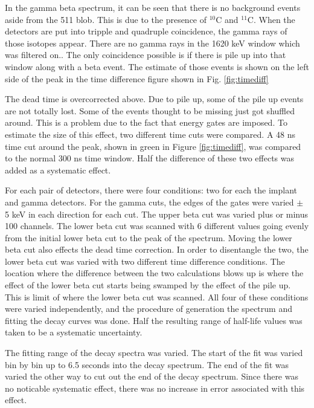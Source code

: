 In the gamma beta spectrum, it can be seen that there is no background events aside from the 511 blob.
This is due to the presence of $^{10}$C and $^{11}$C.
When the detectors are put into tripple and quadruple coincidence, the gamma rays of those isotopes appear.
There are no gamma rays in the 1620 keV window which was filtered on..
The only coincidence possible is if there is pile up into that window along with a beta event.
The estimate of those events is shown on the left side of the peak in the time difference figure shown in Fig. \ref{fig:timediff}  

The dead time is overcorrected above.
Due to pile up, some of the pile up events are not totally lost.
Some of the events thought to be missing just got shuffled around.
This is a problem due to the fact that energy gates are imposed.
To estimate the size of this effect, two different time cuts were compared.
A 48 ns time cut around the peak, shown in green in Figure \ref{fig:timediff}, was compared to the normal 300 ns time window.
Half the difference of these two effects was added as a systematic effect.	 

For each pair of detectors, there were four conditions: two for each the implant and gamma detectors. 
For the gamma cuts, the edges of the gates were varied $\pm$ 5 keV in each direction for each cut.
The upper beta cut was varied plus or minus 100 channels.
The lower beta cut was scanned with 6 different values going evenly from the initial lower beta cut to the peak of the spectrum.
Moving the lower beta cut also effects the dead time correction.
In order to disentangle the two, the lower beta cut was varied with two different time difference conditions.
The location where the difference between the two calculations blows up is where the effect of the lower beta cut starts being swamped by the effect of the pile up.
This is limit of where the lower beta cut was scanned.
All four of these conditions were varied independently, and the procedure of generation the spectrum and fitting the decay curves was done.
Half the resulting range of half-life values was taken to be a systematic uncertainty.
	
The fitting range of the decay spectra was varied. 
The start of the fit was varied bin by bin up to 6.5 seconds into the decay spectrum.
The end of the fit was varied the other way to cut out the end of the decay spectrum.
Since there was no noticable systematic effect, there was no increase in error associated with this effect.


